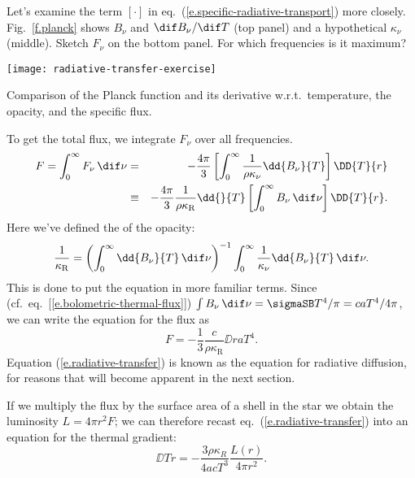 \begin{exercisebox}
\label{ex.radiative-transfer}
Let's examine the term $\left[\cdot\right]$ in eq.~(\ref{e.specific-radiative-transport}) more closely. Fig.~\ref{f.planck} shows $B_{\nu}$ and $\dif B_{\nu}/\dif T$ (top panel) and a hypothetical $\kappa_{\nu}$ (middle). Sketch $F_{\nu}$ on the bottom panel.  For which frequencies is it maximum?
\end{exercisebox}

\begin{marginfigure}
\texttt{[image: radiative-transfer-exercise]}
\caption{\label{f.planck} Comparison of the Planck function and its derivative w.r.t.\ temperature, the opacity, and the specific flux.}
\end{marginfigure}

To get the total flux, we integrate $F_{\nu}$ over all frequencies. 
\begin{eqnarray*}
	F = \int_{0}^{\infty}F_{\nu}\,\dif\nu &=& -\frac{4\pi}{3} \left[\int_{0}^{\infty} \frac{1}{\rho\kappa_{\nu}}\dd{B_{\nu}}{T}\right]\DD{T}{r}\\
	&\equiv& -\frac{4\pi}{3}\frac{1}{\rho\kappa_{\mathrm{R}}}\dd{}{T}\left[\int_{0}^{\infty}B_{\nu}\,\dif\nu\right]\DD{T}{r}.
\end{eqnarray*}
Here we've defined the  of the opacity:
\begin{equation}\label{e.rosseland-opacity}
	\frac{1}{\kappa_{\mathrm{R}}} = \left(\int_{0}^{\infty} \dd{B_{\nu}}{T}\,\dif\nu\right)^{-1}\int_{0}^{\infty} \frac{1}{\kappa_{\nu}}\dd{B_{\nu}}{T}\,\dif\nu.
\end{equation}
This is done to put the equation in more familiar terms. Since (cf.\ eq.~[\ref{e.bolometric-thermal-flux}]) $\int B_{\nu}\,\dif\nu = \sigmaSB T^{4}/\pi = c a T^{4}/4\pi$, we can write the equation for the flux as
\begin{equation}
	F = -\frac{1}{3}\frac{c}{\rho\kappa_{\mathrm{R}}}\DD{}{r}aT^{4}.
\label{e.radiative-transfer}
\end{equation}
Equation (\ref{e.radiative-transfer}) is known as the equation for radiative diffusion, for reasons that will become apparent in the next section.

If we multiply the flux by the surface area of a shell in the star we obtain the luminosity $L = 4\pi r^{2} F$; we can therefore recast eq.~(\ref{e.radiative-transfer}) into an equation for the thermal gradient:
\begin{equation}
    \label{e.gradient-temperature}
    \DD{T}{r} = -\frac{3\rho\kappa_{R}}{4acT^3}\frac{L(r)}{4\pi r^2}.
\end{equation}

